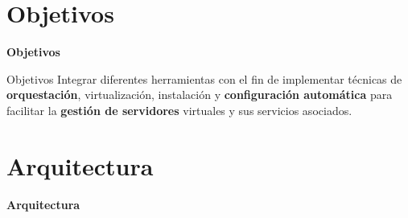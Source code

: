 \section{Objetivos}

\begin{frame}
    \Huge
    \centering
    \textbf{Objetivos}

\end{frame}

\begin{frame}{Objetivos}
    \vspace{0cm}
    Integrar diferentes herramientas con el fin de implementar técnicas de \textbf{orquestación}, virtualización, instalación y \textbf{configuración automática} para facilitar la \textbf{gestión de servidores} virtuales y sus servicios asociados.

\end{frame}

%
%


\section{Arquitectura}

\begin{frame}
    \Huge
    \centering
    \textbf{Arquitectura}

\end{frame}

